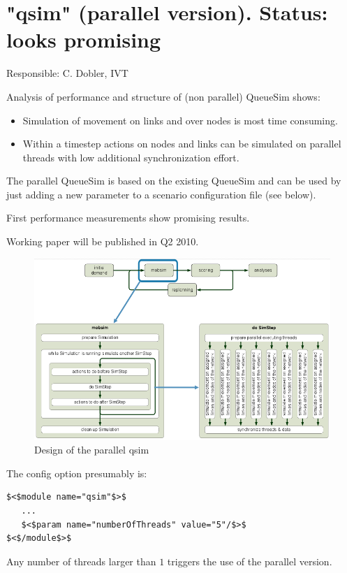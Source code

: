 \vfill\eject
\section{"qsim" (parallel version). Status: looks promising}

Responsible: C. Dobler, IVT

Analysis of performance and structure of (non parallel) QueueSim shows:
\begin{itemize}
	\item Simulation of movement on links and over nodes is most time consuming.
	\item Within a timestep actions on nodes and links can be simulated on parallel threads with low additional synchronization effort.
\end{itemize}

The  parallel QueueSim is based on the existing QueueSim and can be used by  just adding a new parameter to a scenario configuration file (see  below).

First performance measurements show promising results.

Working paper will be published in Q2 2010.

\begin{figure}[htp]
\includegraphics[width=\textwidth]{figures/qsimParallel/parallelqsim.png}
\caption{Design of the parallel qsim}
\end{figure}

The config option presumably is:
\begin{verbatim}
$<$module name="qsim"$>$
   ...
   $<$param name="numberOfThreads" value="5"/$>$
$<$/module$>$

\end{verbatim}

Any number of threads larger than $1$ triggers the use of the parallel version.

